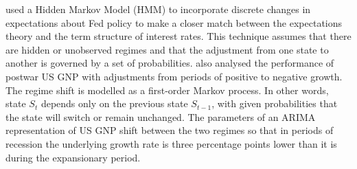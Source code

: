 \documentclass[12pt, a4paper, oneside]{article}\usepackage[]{graphicx}\usepackage[]{color}
\begin{document}

\citet{hamilton1988rational} used a Hidden Markov Model (HMM) to incorporate discrete changes in expectations about Fed policy to make a closer match between the expectations theory and the term structure of interest rates.  This technique assumes that there are hidden or unobserved regimes and that the adjustment from one state to another is governed by a set of probabilities.  \citet{Hamilton1989} also analysed the performance of postwar US GNP with adjustments from periods of positive to negative growth. The regime shift is modelled as a first-order Markov process.  In other words, state $S_t$ depends only on the previous state $S_{t-1}$, with given probabilities that the state will switch or remain unchanged.  The parameters of an ARIMA representation of US GNP shift between the two regimes so that in periods of recession the underlying growth rate is three percentage points lower than it is during the expansionary period.   




\end{document}
